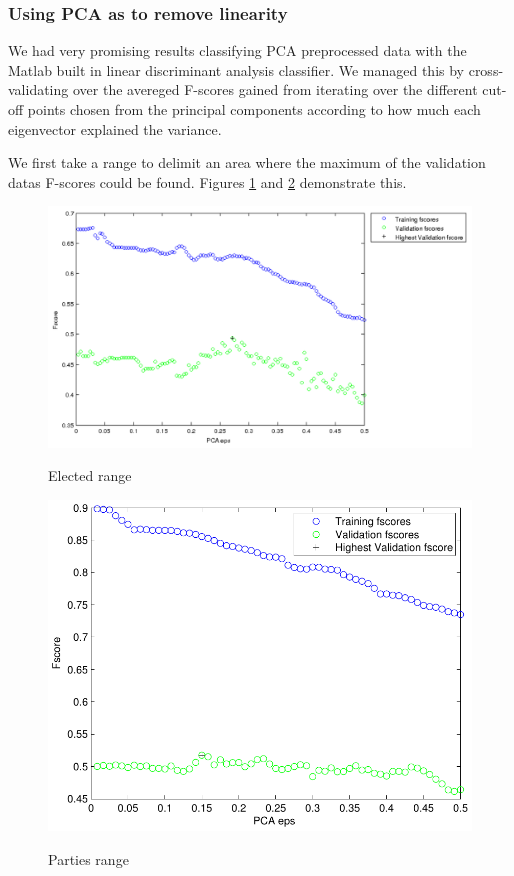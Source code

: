 \documentclass[a4paper,10pt]{article}
\begin{document}
\subsubsection{Using PCA as to remove linearity}
We had very promising results classifying PCA preprocessed data with the Matlab built in linear discriminant analysis classifier. We managed this by cross-validating over the avereged F-scores gained from iterating over the different cut-off points chosen from the principal components according to how much each eigenvector explained the variance.

We first take a range to delimit an area where the maximum of the validation datas F-scores could be found. Figures \ref{fig:elecRange} and \ref{fig:partiesRange} demonstrate this.

\begin{figure}
\begin{center}
	\caption{Elected range}
	{\includegraphics[scale=0.5,angle=0]{./lda_elec_range.pdf}}
	\label{fig:elecRange}
\end{center}
\end{figure}


\begin{figure}
\begin{center}
	\caption{Parties range}
	{\includegraphics[scale=0.5,angle=0]{./lda_party_range.pdf}}
	\label{fig:partiesRange}
\end{center}
\end{figure}
\end{document}

